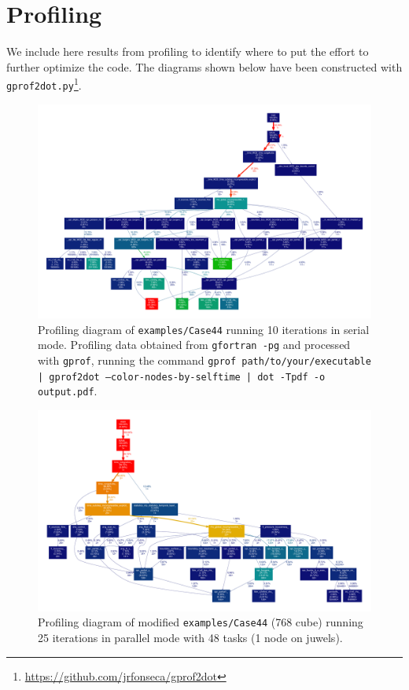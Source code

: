 \chapter{Profiling}\label{sec:profiling}

We include here results from profiling to identify where to put the effort to further optimize the code. The diagrams shown below have been constructed with {\tt gprof2dot.py}\footnote{\url{https://github.com/jrfonseca/gprof2dot}}.

\begin{figure}[H]
  \centering
  \includegraphics[clip,width=\textwidth]{figs/profiling.pdf}
  \caption{Profiling diagram of {\tt examples/Case44} running 10 iterations in serial mode. Profiling data obtained from {\tt gfortran -pg} and processed with {\tt gprof}, running the command {\tt gprof path/to/your/executable | gprof2dot --color-nodes-by-selftime | dot -Tpdf -o output.pdf}.}
\end{figure}

\begin{figure}[H]
  \centering
  \includegraphics[clip,width=\textwidth]{figs/profiling2.pdf}
  \caption{Profiling diagram of modified {\tt examples/Case44} (768 cube) running 25 iterations in parallel mode with 48 tasks (1 node on juwels).}
\end{figure}

